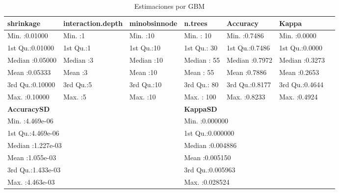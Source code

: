 \begin{table}[htbp]
\centering
\caption{Estimaciones por GBM}
\label{tab:09_tabla_gbm}
\begin{tabular}{lllllll}
\toprule
\textbf{shrinkage} & \textbf{interaction.depth} & \textbf{minobsinnode} & \textbf{n.trees} & \textbf{Accuracy} & \textbf{Kappa} \\
\midrule
Min. :0.01000 & Min. :1 & Min. :10 & Min. : 10 & Min. :0.7486 & Min. :0.0000 \\
1st Qu.:0.01000 & 1st Qu.:1 & 1st Qu.:10 & 1st Qu.: 30 & 1st Qu.:0.7486 & 1st Qu.:0.0000 \\
Median :0.05000 & Median :3 & Median :10 & Median : 55 & Median :0.7972 & Median :0.3273 \\
Mean :0.05333 & Mean :3 & Mean :10 & Mean : 55 & Mean :0.7886 & Mean :0.2653 \\
3rd Qu.:0.10000 & 3rd Qu.:5 & 3rd Qu.:10 & 3rd Qu.: 80 & 3rd Qu.:0.8177 & 3rd Qu.:0.4644 \\
Max. :0.10000 & Max. :5 & Max. :10 & Max. : 100 & Max. :0.8233 & Max. :0.4924 \\
\midrule
\multicolumn{3}{l}{\textbf{AccuracySD}} & \multicolumn{3}{l}{\textbf{KappaSD}} \\
\midrule
\multicolumn{3}{l}{Min. :4.469e-06} & \multicolumn{3}{l}{Min. :0.000000} \\
\multicolumn{3}{l}{1st Qu.:4.469e-06} & \multicolumn{3}{l}{1st Qu.:0.000000} \\
\multicolumn{3}{l}{Median :1.227e-03} & \multicolumn{3}{l}{Median :0.004886} \\
\multicolumn{3}{l}{Mean :1.055e-03} & \multicolumn{3}{l}{Mean :0.005150} \\
\multicolumn{3}{l}{3rd Qu.:1.433e-03} & \multicolumn{3}{l}{3rd Qu.:0.005963} \\
\multicolumn{3}{l}{Max. :4.463e-03} & \multicolumn{3}{l}{Max. :0.028524} \\
\bottomrule
\end{tabular}
\end{table}